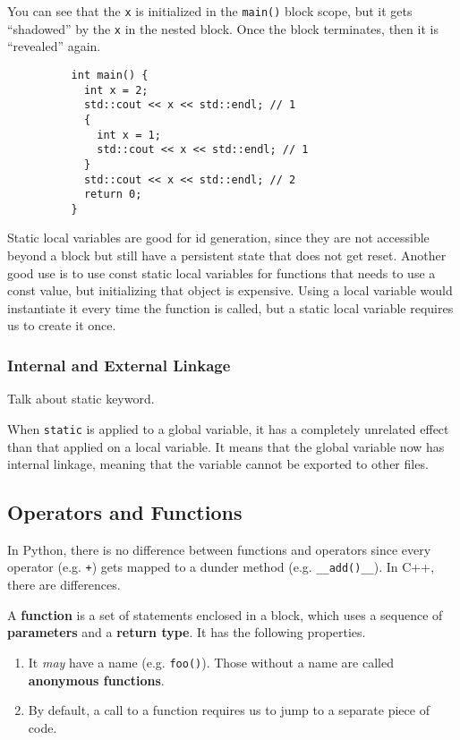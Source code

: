 \documentclass{article}
\begin{document}
      \begin{example}
        You can see that the \texttt{x} is initialized in the \texttt{main()} block scope, but it gets ``shadowed'' by the \texttt{x} in the nested block. Once the block terminates, then it is ``revealed'' again. 

        \begin{lstlisting}
          int main() {  
            int x = 2; 
            std::cout << x << std::endl; // 1
            {
              int x = 1;
              std::cout << x << std::endl; // 1
            }
            std::cout << x << std::endl; // 2 
            return 0; 
          }
        \end{lstlisting}
      \end{example} 

      Static local variables are good for id generation, since they are not accessible beyond a block but still have a persistent state that does not get reset. Another good use is to use const static local variables for functions that needs to use a const value, but initializing that object is expensive. Using a local variable would instantiate it every time the function is called, but a static local variable requires us to create it once. 

    \subsubsection{Internal and External Linkage} 

      Talk about static keyword. 

      When \texttt{static} is applied to a global variable, it has a completely unrelated effect than that applied on a local variable. It means that the global variable now has internal linkage, meaning that the variable cannot be exported to other files. 

  \subsection{Operators and Functions} 

    In Python, there is no difference between functions and operators since every operator (e.g. \texttt{+}) gets mapped to a dunder method (e.g. \texttt{\_\_add()\_\_}). In C++, there are differences. 
    
    \begin{definition}[Function]
      A \textbf{function} is a set of statements enclosed in a block, which uses a sequence of \textbf{parameters} and a \textbf{return type}. It has the following properties. 
      \begin{enumerate}
        \item It \textit{may} have a name (e.g. \texttt{foo()}). Those without a name are called \textbf{anonymous functions}. 
        \item By default, a call to a function requires us to jump to a separate piece of code. 
      \end{enumerate}
    \end{definition}
\end{document}

